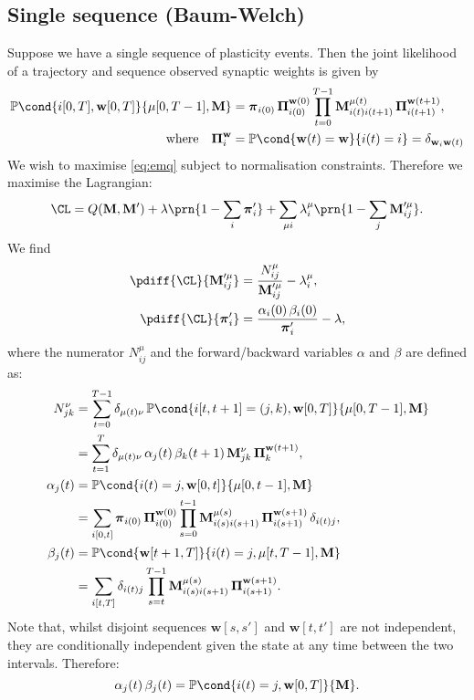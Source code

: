 \documentclass[12pt]{article}
\newcommand{\pib}{\boldsymbol{\pi}}
\newcommand{\Pib}{\boldsymbol{\Pi}}
\newcommand{\w}{\mathbf{w}}
\newcommand{\M}{\mathbf{M}}
\newcommand{\pr}{\mathbb{P}}
\begin{document}
\subsection{Single sequence (Baum-Welch) \label{sec:bw}}

Suppose we have a single sequence of plasticity events.
Then the joint likelihood of a trajectory and sequence observed synaptic weights is given by
%
\begin{equation}\label{eq:trajlike}
\begin{aligned}
  \pr\cond{i[0,T], \w[0,T]}{\mu[0,T-1],\M} &= \pib_{i(0)} \, \Pib_{i(0)}^{\w(0)} 
        \prod_{t=0}^{T-1} \M^{\mu(t)}_{i(t)i(t+1)} \, \Pib_{i(t+1)}^{\w(t+1)},\\
  \text{where}\quad
  \Pib_i^{\w} &= \pr\cond{\w(t) = \w}{i(t) = i}
    = \delta_{\w_{i}\w(t)}
\end{aligned}
\end{equation}
%
We wish to maximise \eqref{eq:emq} subject to normalisation constraints.
Therefore we maximise the Lagrangian:
%
\begin{equation}\label{eq:lagrangesingle}
  \CL = Q(\M,\M') + \lambda\prn{1-\sum_i\pib'_i} + \sum_{\mu i} \lambda^\mu_i\prn{1-\sum_j\M'^\mu_{ij}}. 
\end{equation}
%
We find
%
\begin{equation}\label{eq:singlediffs}
\begin{aligned}
  \pdiff{\CL}{\M'^\mu_{ij}} &= \frac{N^\mu_{ij}}{\M'^\mu_{ij}} - \lambda^\mu_{i}, \\
  \pdiff{\CL}{\pib'_{i}} &= \frac{\alpha_i(0) \, \beta_i(0)}{\pib'_{i}} - \lambda,
\end{aligned}
\end{equation}
%
where the numerator $N^\mu_{ij}$ and the forward/backward variables $\alpha$ and $\beta$ are defined as:
%
\begin{equation}\label{eq:alphabeta}
\begin{aligned}
  N^\nu_{jk} &= \sum_{t=0}^{T-1} \delta_{\mu(t)\nu} \, 
        \pr\cond{i[t,t+1]=(j,k),\w[0,T]}{\mu[0,T-1],\M} \\
     &= \sum_{t=1}^{T} \delta_{\mu(t)\nu} \, 
        \alpha_j(t) \, \beta_k(t+1) \, \M^{\nu}_{jk} \, \Pib_k^{\w(t+1)} ,\\
  \alpha_j(t) &= \pr\cond{i(t)=j,\w[0,t]}{\mu[0,t-1],\M} \\
     &= \sum_{i[0,t]} \pib_{i(0)} \, \Pib_{i(0)}^{\w(0)} \prod_{s=0}^{t-1} \M^{\mu(s)}_{i(s)i(s+1)} \, \Pib_{i(s+1)}^{\w(s+1)} \,\delta_{i(t)j}, \\
  \beta_j(t) &= \pr\cond{\w[t+1,T]}{i(t)=j,\mu[t,T-1],\M} \\
     &= \sum_{i[t,T]} \delta_{i(t)j} \prod_{s=t}^{T-1} \M^{\mu(s)}_{i(s)i(s+1)} \, \Pib_{i(s+1)}^{\w(s+1)}.
\end{aligned}
\end{equation}
%
Note that, whilst disjoint sequences $\w[s,s']$ and $\w[t,t']$ are not independent, they are conditionally independent given the state at any time between the two intervals.
Therefore:
%
\begin{equation}\label{eq:stateprob}
  \alpha_j(t) \, \beta_j(t) = \pr\cond{i(t)=j,\w[0,T]}{\M}.
\end{equation}
%
\end{document}
